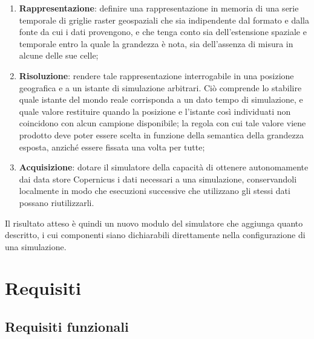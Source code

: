 \begin{enumerate}
    \item \textbf{Rappresentazione}: definire una rappresentazione in memoria di una serie
    temporale di griglie raster geospaziali che sia indipendente dal formato e dalla fonte
    da cui i dati provengono, e che tenga conto sia dell'estensione spaziale e temporale
    entro la quale la grandezza è nota, sia dell'assenza di misura in alcune delle sue
    celle;

    \item \textbf{Risoluzione}: rendere tale rappresentazione interrogabile in una posizione
    geografica e a un istante di simulazione arbitrari. Ciò comprende lo stabilire quale
    istante del mondo reale corrisponda a un dato tempo di simulazione, e quale valore
    restituire quando la posizione e l'istante così individuati non coincidono con alcun
    campione disponibile; la regola con cui tale valore viene prodotto deve poter essere
    scelta in funzione della semantica della grandezza esposta, anziché essere fissata una
    volta per tutte;

    \item \textbf{Acquisizione}: dotare il simulatore della capacità di ottenere
    autonomamente dai data store Copernicus i dati necessari a una simulazione,
    conservandoli localmente in modo che esecuzioni successive che utilizzano gli stessi
    dati possano riutilizzarli.
\end{enumerate}

Il risultato atteso è quindi un nuovo modulo del simulatore che aggiunga quanto descritto,
i cui componenti siano dichiarabili direttamente nella configurazione di una simulazione.

\section{Requisiti}
\label{sec:requisiti}

\subsection{Requisiti funzionali}
\label{subsec:requisiti-funzionali}

